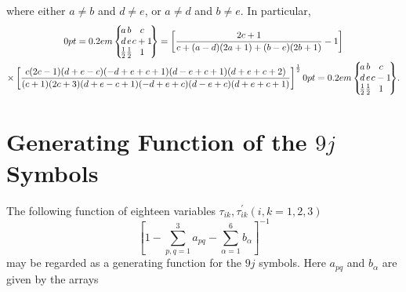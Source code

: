 where either $a \neq b$ and $d \neq e$, or $a \neq d$ and $b \neq e$. In particular,
\begin{gather}
\ninej{a}{b}{c}{d}{e}{c+1}{\frac{1}{2}}{\frac{1}{2}}{1}=\left[\frac{2 c+1}{c+(a-d)(2 a+1)+(b-e)(2 b+1)}-1\right]  \notag\\
\times\left[\frac{c(2 c-1)(d+e-c)(-d+e+c+1)(d-e+c+1)(d+e+c+2)}{(c+1)(2 c+3)(d+e-c+1)(-d+e+c)(d-e+c)(d+e+c+1)}\right]^{\frac{1}{2}}\ninej{a}{b}{c}{d}{e}{c-1}{\frac{1}{2}}{\frac{1}{2}}{1} . \label{eq:10:5:16}
\end{gather}
\section{Generating Function of the $9 j$ Symbols}\label{sec:10.6}
The following function of eighteen variables $\tau_{i k}, \tau_{i k}^{\prime}(i, k=1,2,3)$ \cite{ref111}
\begin{equation}
\left[1-\sum_{p, q=1}^{3} a_{p q}-\sum_{\alpha=1}^{6} b_{\alpha}\right]^{-1} \label{eq:10:6:1}
\end{equation}
may be regarded as a generating function for the $9 j$ symbols. Here $a_{p q}$ and $b_{\alpha}$ are given by the arrays
